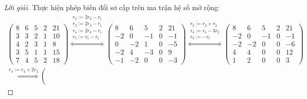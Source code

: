 \documentclass[class=linearalgebra,crop=false]{standalone}
\begin{document}
\begin{proof}[Lời giải]
    \par Thực hiện phép biến đổi sơ cấp trên ma trận hệ số mở rộng:
    \begingroup
    \allowdisplaybreaks
    \begin{gather*}
        \left(
        \begin{array}{cccc|c}
                8 & 6 & 5 & 2 & 21 \\
                3 & 3 & 2 & 1 & 10 \\
                4 & 2 & 3 & 1 & 8  \\
                3 & 5 & 1 & 1 & 15 \\
                7 & 4 & 5 & 2 & 18
            \end{array}
        \right)
        \stackrel{
            \substack{
                r_{2} := 2r_{2} - r_{1} \\
                r_{3} := 2r_{3} - r_{1} \\
                r_{4} := 2r_{4} - r_{1} \\
                r_{5} := r_{5} - r_{1}
            }
        }{\Longleftrightarrow}
        \left(
        \begin{array}{cccc|c}
                8  & 6  & 5  & 2 & 21 \\
                -2 & 0  & -1 & 0 & -1 \\
                0  & -2 & 1  & 0 & -5 \\
                -2 & 4  & -3 & 0 & 9  \\
                -1 & -2 & 0  & 0 & -3
            \end{array}
        \right)
        \stackrel{
        \substack{
        r_{3} := r_{3} + r_{2} \\
        r_{4} := r_{4} - 3r_{2} \\
        r_{5} := -r_{5}
        }
        }{\Longleftrightarrow}
        \left(
        \begin{array}{cccc|c}
                8  & 6  & 5  & 2 & 21 \\
                -2 & 0  & -1 & 0 & -1 \\
                -2 & -2 & 0  & 0 & -6 \\
                4  & 4  & 0  & 0 & 12 \\
                1  & 2  & 0  & 0 & 3
            \end{array}
        \right) \\
        \stackrel{
            r_{4} := r_{4} + 2r_{3}
        }{\Longleftrightarrow}
        \left(

\end{gather*}
\end{proof}
\end{document}
